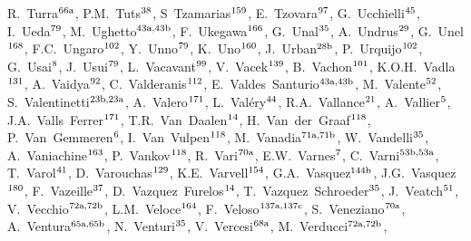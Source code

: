 \begin{flushleft}
R.~Turra$^\textrm{\scriptsize 66a}$,    
P.M.~Tuts$^\textrm{\scriptsize 38}$,    
S~Tzamarias$^\textrm{\scriptsize 159}$,    
E.~Tzovara$^\textrm{\scriptsize 97}$,    
G.~Ucchielli$^\textrm{\scriptsize 45}$,    
I.~Ueda$^\textrm{\scriptsize 79}$,    
M.~Ughetto$^\textrm{\scriptsize 43a,43b}$,    
F.~Ukegawa$^\textrm{\scriptsize 166}$,    
G.~Unal$^\textrm{\scriptsize 35}$,    
A.~Undrus$^\textrm{\scriptsize 29}$,    
G.~Unel$^\textrm{\scriptsize 168}$,    
F.C.~Ungaro$^\textrm{\scriptsize 102}$,    
Y.~Unno$^\textrm{\scriptsize 79}$,    
K.~Uno$^\textrm{\scriptsize 160}$,    
J.~Urban$^\textrm{\scriptsize 28b}$,    
P.~Urquijo$^\textrm{\scriptsize 102}$,    
G.~Usai$^\textrm{\scriptsize 8}$,    
J.~Usui$^\textrm{\scriptsize 79}$,    
L.~Vacavant$^\textrm{\scriptsize 99}$,    
V.~Vacek$^\textrm{\scriptsize 139}$,    
B.~Vachon$^\textrm{\scriptsize 101}$,    
K.O.H.~Vadla$^\textrm{\scriptsize 131}$,    
A.~Vaidya$^\textrm{\scriptsize 92}$,    
C.~Valderanis$^\textrm{\scriptsize 112}$,    
E.~Valdes~Santurio$^\textrm{\scriptsize 43a,43b}$,    
M.~Valente$^\textrm{\scriptsize 52}$,    
S.~Valentinetti$^\textrm{\scriptsize 23b,23a}$,    
A.~Valero$^\textrm{\scriptsize 171}$,    
L.~Val\'ery$^\textrm{\scriptsize 44}$,    
R.A.~Vallance$^\textrm{\scriptsize 21}$,    
A.~Vallier$^\textrm{\scriptsize 5}$,    
J.A.~Valls~Ferrer$^\textrm{\scriptsize 171}$,    
T.R.~Van~Daalen$^\textrm{\scriptsize 14}$,    
H.~Van~der~Graaf$^\textrm{\scriptsize 118}$,    
P.~Van~Gemmeren$^\textrm{\scriptsize 6}$,    
I.~Van~Vulpen$^\textrm{\scriptsize 118}$,    
M.~Vanadia$^\textrm{\scriptsize 71a,71b}$,    
W.~Vandelli$^\textrm{\scriptsize 35}$,    
A.~Vaniachine$^\textrm{\scriptsize 163}$,    
P.~Vankov$^\textrm{\scriptsize 118}$,    
R.~Vari$^\textrm{\scriptsize 70a}$,    
E.W.~Varnes$^\textrm{\scriptsize 7}$,    
C.~Varni$^\textrm{\scriptsize 53b,53a}$,    
T.~Varol$^\textrm{\scriptsize 41}$,    
D.~Varouchas$^\textrm{\scriptsize 129}$,    
K.E.~Varvell$^\textrm{\scriptsize 154}$,    
G.A.~Vasquez$^\textrm{\scriptsize 144b}$,    
J.G.~Vasquez$^\textrm{\scriptsize 180}$,    
F.~Vazeille$^\textrm{\scriptsize 37}$,    
D.~Vazquez~Furelos$^\textrm{\scriptsize 14}$,    
T.~Vazquez~Schroeder$^\textrm{\scriptsize 35}$,    
J.~Veatch$^\textrm{\scriptsize 51}$,    
V.~Vecchio$^\textrm{\scriptsize 72a,72b}$,    
L.M.~Veloce$^\textrm{\scriptsize 164}$,    
F.~Veloso$^\textrm{\scriptsize 137a,137c}$,    
S.~Veneziano$^\textrm{\scriptsize 70a}$,    
A.~Ventura$^\textrm{\scriptsize 65a,65b}$,    
N.~Venturi$^\textrm{\scriptsize 35}$,    
V.~Vercesi$^\textrm{\scriptsize 68a}$,    
M.~Verducci$^\textrm{\scriptsize 72a,72b}$,    

\end{flushleft}
